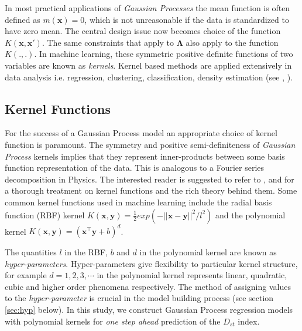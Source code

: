 \documentclass[referee,a4paper,12pt,traditabstract]{swsc}
\begin{document}
\begin{linenumbers}
In most practical applications of \emph{Gaussian Processes} the mean function is often defined as $m(\mathbf{x}) = 0$, which is not unreasonable if the data is standardized to have zero mean. The central design issue now becomes choice of the function $K(\mathbf{x}, \mathbf{x}')$. The same constraints that apply to $\mathbf{\Lambda}$ also apply to the function $K(.,.)$. In machine learning, these symmetric positive definite functions of two variables are known as \emph{kernels}. Kernel based methods are applied extensively in data analysis i.e. regression, clustering, classification, density estimation (see \citet{Scholkopf:2001:LKS:559923}, \citet{hofmann2008}).

\subsection{Kernel Functions}

For the success of a Gaussian Process model an appropriate choice of kernel function is paramount. The symmetry and positive semi-definiteness of \emph{Gaussian Process} kernels implies that they represent inner-products between some basis function representation of the data. This is analogous to a Fourier series decomposition in Physics. The interested reader is suggested to refer to \cite{Berlinet2004}, \citet{Scholkopf:2001:LKS:559923} and \citet{hofmann2008} for a thorough treatment on kernel functions and the rich theory behind them. Some common kernel functions used in machine learning include the radial basis function (RBF) kernel $K(\mathbf{x}, \mathbf{y}) = \frac{1}{2} exp(-||\mathbf{x} - \mathbf{y}||^2/l^2)$ and the polynomial kernel $K(\mathbf{x}, \mathbf{y}) = (\mathbf{x}^\intercal \mathbf{y} + b)^d$. 

The quantities $l$ in the RBF, $b$ and $d$ in the polynomial kernel are known as \emph{hyper-parameters}. Hyper-parameters give flexibility to particular kernel structure, for example $d = 1, 2, 3, \cdots$ in the polynomial kernel represents linear, quadratic, cubic and higher order phenomena respectively. The method of assigning values to the \emph{hyper-parameter} is crucial in the model building process (see section \ref{sec:hyp} below). In this study, we construct Gaussian Process regression models with polynomial kernels for \emph{one step ahead} prediction of the $D_{st}$ index. 

\end{linenumbers}
\end{document}
